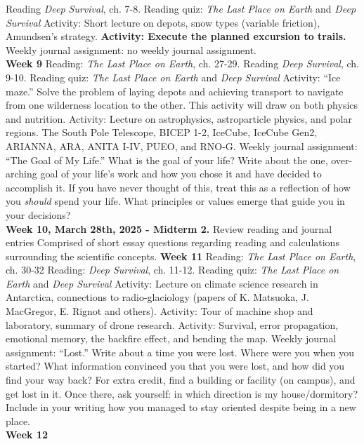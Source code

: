 \documentclass[10pt]{article}
\begin{document}
\begin{outline}[enumerate]
\2 Reading \textit{Deep Survival}, ch. 7-8.
\2 Reading quiz: \textit{The Last Place on Earth} and \textit{Deep Survival}
\2 Activity: Short lecture on depots, snow types (variable friction), Amundsen's strategy.
\2 \textbf{Activity: Execute the planned excursion to trails.}
\2 Weekly journal assignment: no weekly journal assignment. \\
\1 \textbf{Week 9}
\2 Reading: \textit{The Last Place on Earth}, ch. 27-29.
\2 Reading \textit{Deep Survival}, ch. 9-10.
\2 Reading quiz: \textit{The Last Place on Earth} and \textit{Deep Survival}
\2 Activity: ``Ice maze.''  Solve the problem of laying depots and achieving transport to navigate from one wilderness location to the other.  This activity will draw on both physics and nutrition.
\2 Activity: Lecture on astrophysics, astroparticle physics, and polar regions.  The South Pole Telescope, BICEP 1-2, IceCube, IceCube Gen2, ARIANNA, ARA, ANITA I-IV, PUEO, and RNO-G.
\2 Weekly journal assignment: ``The Goal of My Life.'' What is the goal of your life?  Write about the one, over-arching goal of your life's work and how you chose it and have decided to accomplish it.  If you have never thought of this, treat this as a reflection of how you \textit{should} spend your life.  What principles or values emerge that guide you in your decisions? \\
\1 \textbf{Week 10, March 28th, 2025 - Midterm 2.}
\2 Review reading and journal entries
\2 Comprised of short essay questions regarding reading and calculations surrounding the scientific concepts.
\1 \textbf{Week 11}
\2 Reading: \textit{The Last Place on Earth}, ch. 30-32
\2 Reading: \textit{Deep Survival}, ch. 11-12.
\2 Reading quiz: \textit{The Last Place on Earth} and \textit{Deep Survival}
\2 Activity: Lecture on climate science research in Antarctica, connections to radio-glaciology (papers of K. Matsuoka, J. MacGregor, E. Rignot and others).
\2 Activity: Tour of machine shop and laboratory, summary of drone research.
\2 Activity: Survival, error propagation, emotional memory, the backfire effect, and bending the map.
\2 Weekly journal assignment: ``Lost.'' Write about a time you were lost.  Where were you when you started?  What information convinced you that you were lost, and how did you find your way back?  For extra credit, find a building or facility (on campus), and get lost in it.  Once there, ask yourself: in which direction is my house/dormitory?  Include in your writing how you managed to stay oriented despite being in a new place. \\
\1 \textbf{Week 12}

\end{outline}
\end{document}
